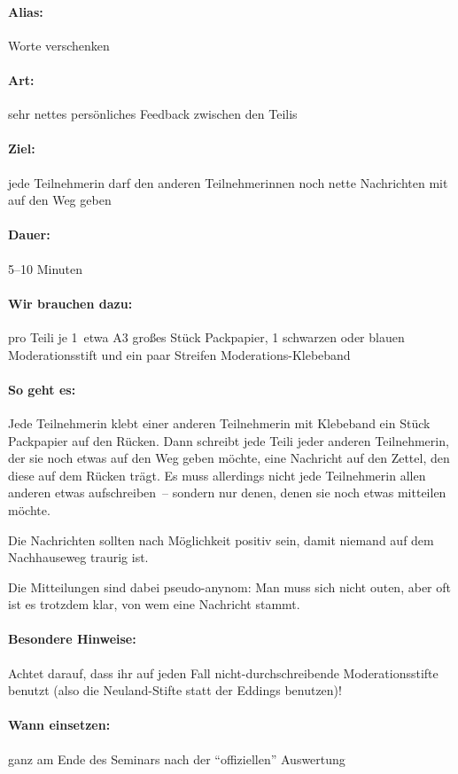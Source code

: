 \paragraph{Alias:} Worte verschenken
\paragraph{Art:} sehr nettes persönliches Feedback zwischen den Teilis
\paragraph{Ziel:} jede Teilnehmerin darf den anderen Teilnehmerinnen noch nette Nachrichten mit auf den Weg geben
\paragraph{Dauer:} 5--10 Minuten
\paragraph{Wir brauchen dazu:} pro Teili je 1~etwa A3 großes Stück Packpapier, 1 schwarzen oder blauen Moderationsstift und ein paar Streifen Moderations-Klebeband
\paragraph{So geht es:} Jede Teilnehmerin klebt einer anderen Teilnehmerin mit Klebeband ein Stück Packpapier auf den Rücken. Dann schreibt jede Teili jeder anderen Teilnehmerin, der sie noch etwas auf den Weg geben möchte, eine Nachricht auf den Zettel, den diese auf dem Rücken trägt. Es muss allerdings nicht jede Teilnehmerin allen anderen etwas aufschreiben~-- sondern nur denen, denen sie noch etwas mitteilen möchte.

Die Nachrichten sollten nach Möglichkeit positiv sein, damit niemand auf dem Nachhauseweg traurig ist.

Die Mitteilungen sind dabei pseudo-anynom: Man muss sich nicht outen, aber oft ist es trotzdem klar, von wem eine Nachricht stammt.

\paragraph{Besondere Hinweise:} Achtet darauf, dass ihr auf jeden Fall nicht-durchschreibende Moderationsstifte benutzt (also die Neuland-Stifte statt der Eddings benutzen)!
\paragraph{Wann einsetzen:} ganz am Ende des Seminars nach der "`offiziellen"' Auswertung

